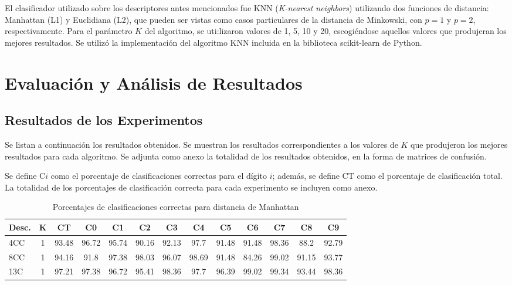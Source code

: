 \documentclass[12pt]{article}
\begin{document}
El clasificador utilizado sobre los descriptores antes mencionados fue KNN
(\emph{K-nearest neighbors}) utilizando dos funciones de distancia: Manhattan
(L1) y Euclidiana (L2), que pueden ser vistas como casos particulares de la
distancia de Minkowski, con $p=1$ y $p=2$, respectivamente. Para el parámetro
$K$ del algoritmo, se uti:lizaron valores de 1, 5, 10 y 20, escogiéndose
aquellos valores que produjeran los mejores resultados. Se utilizó la
implementación del algoritmo KNN incluida en la biblioteca scikit-learn de
Python.

\section{Evaluación y Análisis de Resultados}

\subsection{Resultados de los Experimentos}

Se listan a continuación los resultados obtenidos. Se muestran los resultados
correspondientes a los valores de $K$ que produjeron los mejores resultados para
cada algoritmo. Se adjunta como anexo la totalidad de los resultados obtenidos,
en la forma de matrices de confusión.

Se define C$i$ como el porcentaje de clasificaciones correctas para el dígito
$i$; además, se define CT como el porcentaje de clasificación total. La
totalidad de los porcentajes de clasificación correcta para cada experimento se
incluyen como anexo.

\begin{table}[H]
\begin{tabular}{|l|c|c|c|c|c|c|c|c|c|c|c|c|}
\hline
\textbf{Desc.}&\textbf{K}&\textbf{CT}&\textbf{C0}&\textbf{C1}&\textbf{C2}&\textbf{C3}&\textbf{C4}&\textbf{C5}&\textbf{C6}&\textbf{C7}&\textbf{C8}&\textbf{C9}\\
\hline
4CC&1&93.48&96.72&95.74&90.16&92.13&97.7&91.48&91.48&98.36&88.2&92.79\\
\hline
8CC&1&94.16&91.8&97.38&98.03&96.07&98.69&91.48&84.26&99.02&91.15&93.77\\
\hline
13C&1&97.21&97.38&96.72&95.41&98.36&97.7&96.39&99.02&99.34&93.44&98.36\\
\hline
\end{tabular}
\caption{Porcentajes de clasificaciones correctas para distancia de Manhattan}
\end{table}
\end{document}

